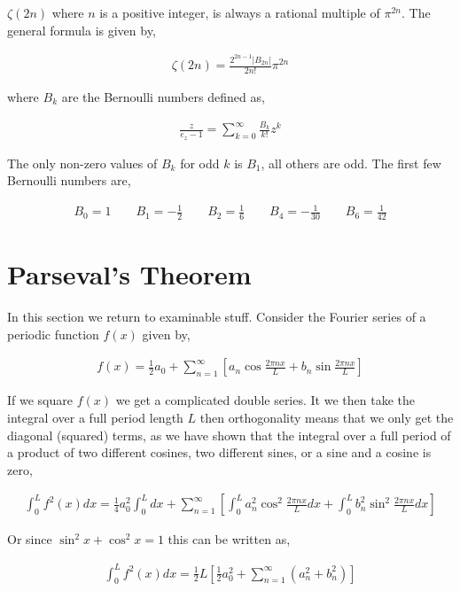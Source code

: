 \documentclass[11pt]{amsart}
\begin{document}
$\zeta(2n)$ where $n$ is a positive integer, is always a rational multiple of $\pi^{2n}$. The general formula is given by,

\begin{align*}
  \zeta(2n) = \frac{2^{2n-1} |B_{2n}|}{2n!} \pi^{2n}
\end{align*}

where $B_k$ are the Bernoulli numbers defined as,

\begin{align*}
  \frac{z}{e_z - 1} = \sum\limits_{k=0}^{\infty}\frac{B_k}{k!} z^k
\end{align*}

The only non-zero values of $B_k$ for odd $k$ is $B_1$, all others are odd. The first few Bernoulli numbers are,

\begin{align*}
  B_0 = 1 \qquad B_1 = -\frac{1}{2} \qquad B_2 = \frac{1}{6} \qquad B_4 = -\frac{1}{30} \qquad B_6 = \frac{1}{42}
\end{align*}


\section{Parseval's Theorem}

In this section we return to examinable stuff. Consider the Fourier series of a periodic function $f(x)$ given by,

\begin{align*}
  f(x) = \frac{1}{2}a_0 + \sum\limits_{n=1}^{\infty}\left[a_n\cos{\frac{2\pi nx}{L}} + b_n\sin{\frac{2\pi nx}{L}}\right]
\end{align*}

If we square $f(x)$ we get a complicated double series. It we then take the integral over a full period length $L$ then orthogonality means that we only get the diagonal (squared) terms, as we have shown that the integral over a full period of a product of two different cosines, two different sines, or a sine and a cosine is zero,

\begin{align*}
  \int_0^L f^2(x) dx = \frac{1}{4}a_0^2\int_0^Ldx + \sum\limits_{n=1}^{\infty}\left[\int_0^L a_n^2\cos^2{\frac{2\pi nx}{L}} dx + \int_0^L b_n^2 \sin^2{\frac{2\pi nx}{L}} dx\right]
\end{align*}

Or since $\sin^2{x} + \cos^2{x} = 1$ this can be written as,

\begin{align*}
  \int_0^L f^2(x) dx = \frac{1}{2}L\left[\frac{1}{2}a_0^2 + \sum\limits_{n=1}^{\infty}\left(a_n^2+b_n^2\right)\right]
\end{align*}
\end{document}
